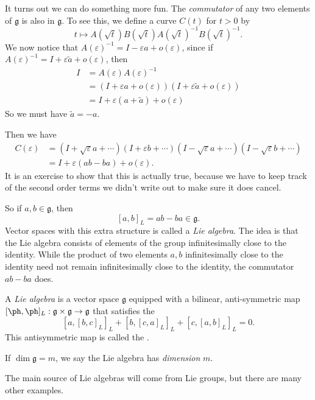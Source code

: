 \documentclass[a4paper]{article}
\begin{document}
It turns out we can do something more fun. The \emph{commutator} of any two elements of $\mathfrak{g}$ is also in $\mathfrak{g}$. To see this, we define a curve $C(t)$ for $t > 0$ by
\[
  t \mapsto A(\sqrt{t}) B(\sqrt{t}) A(\sqrt{t})^{-1} B(\sqrt{t})^{-1}.
\]
We now notice that $A(\varepsilon)^{-1} = I - \varepsilon a + o(\varepsilon)$, since if $A(\varepsilon)^{-1} = I + \varepsilon \tilde{a} + o(\varepsilon)$, then
\begin{align*}
  I &= A(\varepsilon) A(\varepsilon)^{-1}\\
  &= (I + \varepsilon a + o(\varepsilon))(I + \varepsilon \tilde{a} + o(\varepsilon))\\
  &= I + \varepsilon(a + \tilde{a}) + o(\varepsilon)
\end{align*}
So we must have $\tilde{a} = -a$.

Then we have
\begin{align*}
  C(\varepsilon) &= (I + \sqrt{\varepsilon} a + \cdots)(I + \varepsilon b + \cdots) (I - \sqrt{\varepsilon} a + \cdots )(I - \sqrt{\varepsilon} b + \cdots)\\
  &= I + \varepsilon(ab - ba) + o(\varepsilon).
\end{align*}
It is an exercise to show that this is actually true, because we have to keep track of the second order terms we didn't write out to make sure it does cancel.

So if $a, b \in \mathfrak{g}$, then
\[
  [a, b]_L = ab - ba \in \mathfrak{g}.
\]
Vector spaces with this extra structure is called a \emph{Lie algebra}. The idea is that the Lie algebra consists of elements of the group infinitesimally close to the identity. While the product of two elements $a, b$ infinitesimally close to the identity need not remain infinitesimally close to the identity, the commutator $ab - ba$ does.

\begin{defi}
  A \emph{Lie algebra} is a vector space $\mathfrak{g}$ equipped with a bilinear, anti-symmetric map $[\ph, \ph]_L: \mathfrak{g} \times \mathfrak{g} \to \mathfrak{g}$ that satisfies the 
  \[
    [a, [b, c]_L]_L + [b, [c, a]_L]_L + [c, [a, b]_L]_L = 0.
  \]
  This antisymmetric map is called the .

  If $\dim \mathfrak{g} = m$, we say the Lie algebra has \emph{dimension} $m$.
\end{defi}

The main source of Lie algebras will come from Lie groups, but there are many other examples.
\end{document}

